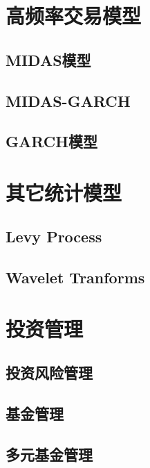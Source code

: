 \documentclass[]{book}
\theoremstyle{definition}
\theoremstyle{definition}
\theoremstyle{definition}
\theoremstyle{remark}
\begin{document}
\section{高频率交易模型}

\hypertarget{midas}{%
\subsection{MIDAS模型}\label{midas}}

\hypertarget{midas-garch}{%
\subsection{MIDAS-GARCH}\label{midas-garch}}

\hypertarget{garch-2}{%
\subsection{GARCH模型}\label{garch-2}}

\section{其它统计模型}

\hypertarget{levy-process}{%
\subsection{Levy Process}\label{levy-process}}

\hypertarget{wavelet-tranforms}{%
\subsection{Wavelet Tranforms}\label{wavelet-tranforms}}

\section{投资管理}

\subsection{投资风险管理}

\subsection{基金管理}

\subsection{多元基金管理}
\end{document}
